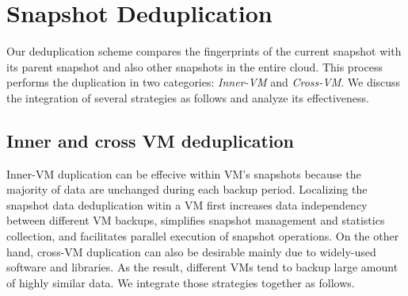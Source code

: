 \section{Snapshot Deduplication}
\label{sect:dedupe}


Our  deduplication scheme compares the fingerprints of the current snapshot
with its parent snapshot and also other snapshots in the entire cloud.
This process performs   the duplication in two categories: \textit{Inner-VM} and \textit{Cross-VM}. 
We discuss the integration of several strategies as follows and analyze its effectiveness.

\subsection{Inner and cross VM deduplication}

Inner-VM duplication can be effecive within  VM's snapshots because the majority of data are unchanged during each backup period. 
Localizing the snapshot data deduplication witin  a VM first
increases data independency between different VM backups,
simplifies snapshot management and statistics collection,
and facilitates parallel execution of snapshot operations.
On the other hand, cross-VM duplication can also be desirable mainly due to widely-used software and libraries. 
As the result, different VMs tend to backup large amount of highly similar data.
We integrate those strategies together as follows.

